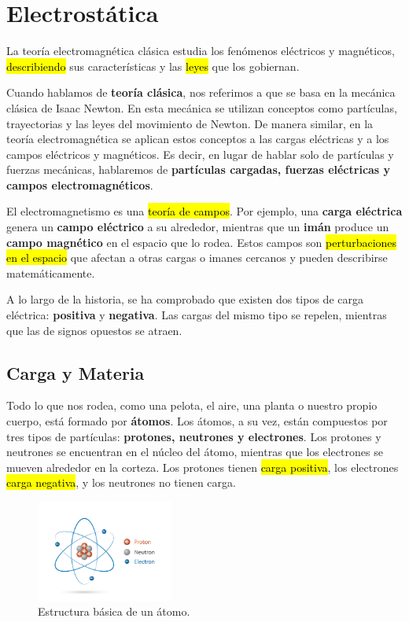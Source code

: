 \section{Electrostática}

La teoría electromagnética clásica estudia los fenómenos eléctricos y magnéticos, \hl{describiendo} sus características y las \hl{leyes} que los gobiernan.  

Cuando hablamos de \textbf{teoría clásica}, nos referimos a que se basa en la mecánica clásica de Isaac Newton. En esta mecánica se utilizan conceptos como partículas, trayectorias y las leyes del movimiento de Newton. De manera similar, en la teoría electromagnética se aplican estos conceptos a las cargas eléctricas y a los campos eléctricos y magnéticos. Es decir, en lugar de hablar solo de partículas y fuerzas mecánicas, hablaremos de \textbf{partículas cargadas, fuerzas eléctricas y campos electromagnéticos}.  

El electromagnetismo es una \hl{teoría de campos}. Por ejemplo, una \textbf{carga eléctrica} genera un \textbf{campo eléctrico} a su alrededor, mientras que un \textbf{imán} produce un \textbf{campo magnético} en el espacio que lo rodea. Estos campos son \hl{perturbaciones en el espacio} que afectan a otras cargas o imanes cercanos y pueden describirse matemáticamente.  

A lo largo de la historia, se ha comprobado que existen dos tipos de carga eléctrica: \textbf{positiva} y \textbf{negativa}. Las cargas del mismo tipo se repelen, mientras que las de signos opuestos se atraen.  

\subsection{Carga y Materia}

Todo lo que nos rodea, como una pelota, el aire, una planta o nuestro propio cuerpo, está formado por \textbf{átomos}. Los átomos, a su vez, están compuestos por tres tipos de partículas: \textbf{protones, neutrones y electrones}. Los protones y neutrones se encuentran en el núcleo del átomo, mientras que los electrones se mueven alrededor en la corteza. Los protones tienen \hl{carga positiva}, los electrones \hl{carga negativa}, y los neutrones no tienen carga. 

\begin{figure}[ht]
    \centering
    \includegraphics[width=0.4\textwidth]{images/atom_struct.jpg}
    \caption{Estructura básica de un átomo.}
    \label{fig:atom_struct}
\end{figure}

